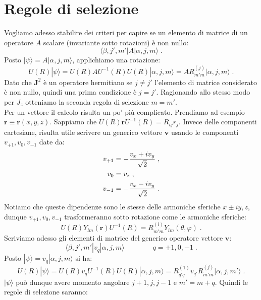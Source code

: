 \documentclass[12pt,a4paper]{report}
\theoremstyle{definition}
\numberwithin{equation}{section}
\newcommand{\bra}{\langle}
\newcommand{\ket}{\rangle}
\begin{document}
\section{Regole di selezione}
Vogliamo adesso stabilire dei criteri per capire se un elemento di matrice di un operatore $A$ scalare (invariante sotto rotazioni) è non nullo:
\begin{equation}
\bra \beta,j',m'|A|\alpha,j,m\ket\;.
\end{equation}
Posto $|\psi\ket=A|\alpha,j,m\ket$, applichiamo una rotazione:
\begin{equation}
U(R)|\psi\ket=U(R)AU^{-1}(R)U(R)|\alpha,j,m\ket=AR^{(j)}_{m'm}|\alpha,j,m\ket\;.
\end{equation}
Dato che $\mathbf{J}^2$ è un operatore hermitiano se $j\ne j'$ l'elemento di matrice considerato è non nullo, quindi una prima condizione è $j=j'$. Ragionando allo stesso modo per $J_z$ otteniamo la seconda regola di selezione $m=m'$. \\
Per un vettore il calcolo risulta un po' più complicato. Prendiamo ad esempio $\mathbf{r}\equiv \mathbf{r}(x,y,z)$. Sappiamo che $U(R)\mathbf{r}U^{-1}(R)=R_{ij}r_j$. Invece delle componenti cartesiane, risulta utile scrivere un generico vettore $\mathbf{v}$ usando le componenti $v_{+1},v_0,v_{-1}$ date da:
\begin{align}
v_{+1} &= -\frac{v_x+iv_y}{\sqrt{2}} \notag\;, \\
v_0 &= v_z \notag\;, \\
v_{-1} &= -\frac{v_x-iv_y}{\sqrt{2}}\;.
\end{align}
Notiamo che queste dipendenze sono le stesse delle armoniche sferiche $x\pm iy,z$, dunque $v_{+1},v_0,v_{-1}$ trasformeranno sotto rotazione come le armoniche sferiche:
\begin{equation*}
U(R)Y_{lm}(\mathbf{r})U^{-1}(R)=R^{(l)}_{m'm}Y_{lm}(\theta,\varphi)\;.
\end{equation*}
Scriviamo adesso gli elementi di matrice del generico operatore vettore $\mathbf{v}$:
\begin{equation}
\bra\beta,j',m'|v_q|\alpha,j,m\ket \qquad \qquad q=+1,0,-1\;.
\end{equation}
Posto $|\psi\ket=v_q|\alpha,j,m\ket$ si ha:
\begin{equation}
U(R)|\psi\ket=U(R)v_qU^{-1}(R)U(R)|\alpha,j,m\ket=R^{(1)}_{q'q}v_{q'}R^{(j)}_{m'm}|\alpha,j,m'\ket\;.
\end{equation}
$|\psi\ket$ può dunque avere momento angolare $j+1,j,j-1$ e $m'=m+q$. Quindi le regole di selezione saranno:
\end{document}
